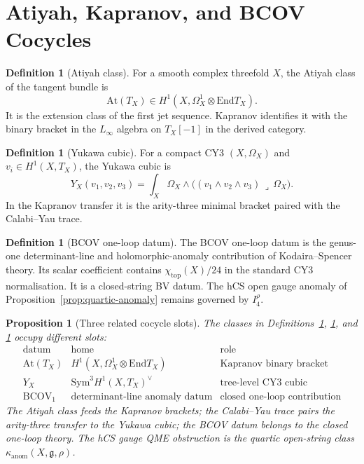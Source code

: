 \documentclass[11pt]{amsart}
\newtheorem{proposition}[theorem]{Proposition}
\theoremstyle{definition}
\newtheorem{definition}[theorem]{Definition}
\theoremstyle{remark}
\providecommand{\End}{\mathrm{End}}
\providecommand{\Sym}{\mathrm{Sym}}
\providecommand{\BCOV}{\mathrm{BCOV}}
\providecommand{\At}{\mathrm{At}}
\providecommand{\fg}{\mathfrak{g}}
\providecommand{\kanom}{\kappa_{\mathrm{anom}}}
\begin{document}
\section{Atiyah, Kapranov, and BCOV Cocycles}

\begin{definition}[Atiyah class]
\label{def:atiyah}
For a smooth complex threefold $X$, the Atiyah class of the tangent
bundle is
\[
  \At(T_X)\in H^1(X,\Omega^1_X\otimes\End T_X).
\]
It is the extension class of the first jet sequence.  Kapranov identifies
it with the binary bracket in the $L_\infty$ algebra on $T_X[-1]$ in
the derived category.
\end{definition}

\begin{definition}[Yukawa cubic]
\label{def:yukawa}
For a compact CY3 $(X,\Omega_X)$ and
$v_i\in H^1(X,T_X)$, the Yukawa cubic is
\[
  Y_X(v_1,v_2,v_3)
  =
  \int_X
  \Omega_X\wedge
  \bigl((v_1\wedge v_2\wedge v_3)\,\lrcorner\,\Omega_X\bigr).
\]
In the Kapranov transfer it is the arity-three minimal bracket paired
with the Calabi--Yau trace.
\end{definition}

\begin{definition}[BCOV one-loop datum]
\label{def:bcov}
The BCOV one-loop datum is the genus-one determinant-line and
holomorphic-anomaly contribution of Kodaira--Spencer theory.  Its scalar
coefficient contains $\chi_{\mathrm{top}}(X)/24$ in the standard CY3
normalisation.  It is a closed-string BV datum.  The hCS open gauge
anomaly of Proposition~\ref{prop:quartic-anomaly} remains governed by
$I_4^\rho$.
\end{definition}

\begin{proposition}[Three related cocycle slots]
\label{prop:three-cocycles}
The classes in Definitions~\ref{def:atiyah}, \ref{def:yukawa}, and
\ref{def:bcov} occupy different slots:
\[
\begin{array}{c|c|c}
\text{datum} & \text{home} & \text{role}\\
\hline
\At(T_X) & H^1(X,\Omega^1_X\otimes\End T_X)
  & \text{Kapranov binary bracket}\\
Y_X & \Sym^3 H^1(X,T_X)^\vee
  & \text{tree-level CY3 cubic}\\
\BCOV_1 & \text{determinant-line anomaly datum}
  & \text{closed one-loop contribution}
\end{array}
\]
The Atiyah class feeds the Kapranov brackets; the Calabi--Yau trace pairs
the arity-three transfer to the Yukawa cubic; the BCOV datum belongs to
the closed one-loop theory.  The hCS gauge QME obstruction is the quartic
open-string class $\kanom(X,\fg,\rho)$.
\end{proposition}
\end{document}
